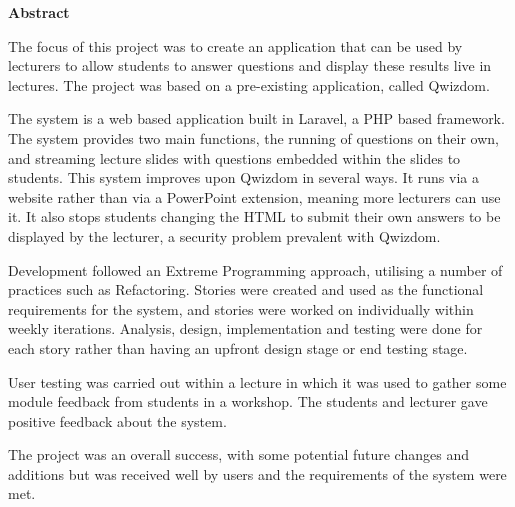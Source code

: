 \thispagestyle{empty}

\begin{center}
    {\LARGE\bf Abstract}
\end{center}

The focus of this project was to create an application that can be used by lecturers to allow students to answer questions and display these results live in lectures. The project was based on a pre-existing application, called Qwizdom.

The system is a web based application built in Laravel, a PHP based framework. The system provides two main functions, the running of questions on their own, and streaming lecture slides with questions embedded within the slides to students. This system improves upon Qwizdom in several ways. It runs via a website rather than via a PowerPoint extension, meaning more lecturers can use it. It also stops students changing the HTML to submit their own answers to be displayed by the lecturer, a security problem prevalent with Qwizdom.

Development followed an Extreme Programming approach, utilising a number of practices such as Refactoring. Stories were created and used as the functional requirements for the system, and stories were worked on individually within weekly iterations. Analysis, design, implementation and testing were done for each story rather than having an upfront design stage or end testing stage.

User testing was carried out within a lecture in which it was used to gather some module feedback from students in a workshop. The students and lecturer gave positive feedback about the system.

The project was an overall success, with some potential future changes and additions but was received well by users and the requirements of the system were met.
